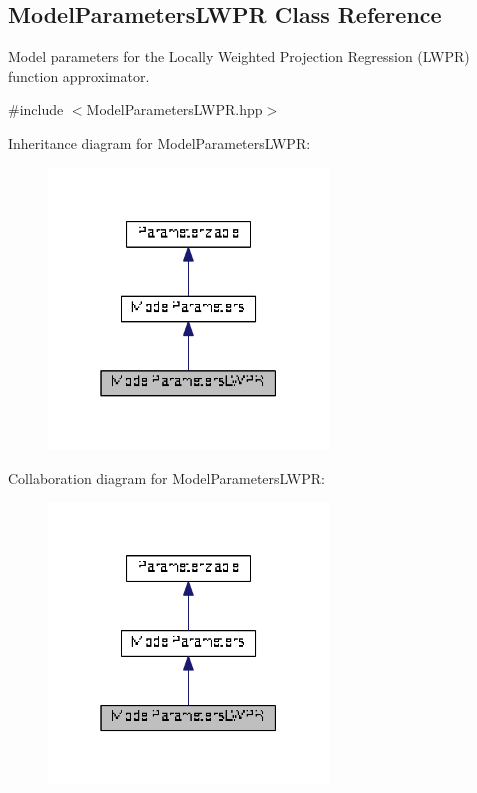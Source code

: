\hypertarget{classDmpBbo_1_1ModelParametersLWPR}{\subsection{Model\+Parameters\+L\+W\+P\+R Class Reference}
\label{classDmpBbo_1_1ModelParametersLWPR}
}


Model parameters for the Locally Weighted Projection Regression (L\+W\+P\+R) function approximator.  




{\ttfamily \#include $<$Model\+Parameters\+L\+W\+P\+R.\+hpp$>$}



Inheritance diagram for Model\+Parameters\+L\+W\+P\+R\+:
\nopagebreak
\begin{figure}[H]
\begin{center}
\leavevmode
\includegraphics[width=211pt]{classDmpBbo_1_1ModelParametersLWPR__inherit__graph}
\end{center}
\end{figure}


Collaboration diagram for Model\+Parameters\+L\+W\+P\+R\+:
\nopagebreak
\begin{figure}[H]
\begin{center}
\leavevmode
\includegraphics[width=211pt]{classDmpBbo_1_1ModelParametersLWPR__coll__graph}
\end{center}
\end{figure}
